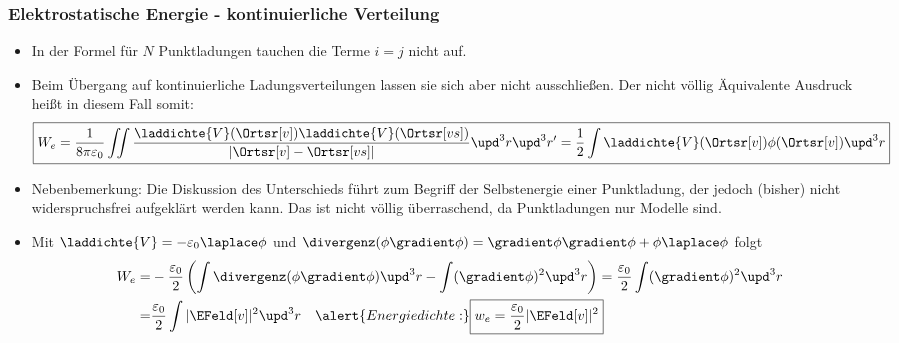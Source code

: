   \begin{frame}
    \frametitle{Elektrostatische Energie - kontinuierliche Verteilung}
    \begin{itemize}[<+->]
      \item In der Formel für $N$ Punktladungen tauchen die Terme
        $i=j$ nicht auf.
        \item Beim Übergang auf kontinuierliche Ladungsverteilungen
          lassen sie sich aber nicht ausschließen. Der \alert{nicht
            völlig Äquivalente} Ausdruck heißt in diesem Fall somit:
          $$
         \boxed{ W_e = \frac{1}{8\pi\varepsilon_0} \iint
    \frac{\laddichte{V}(\Ortsr[v]) \laddichte{V}(\Ortsr[vs])}{|\Ortsr[v]-
      \Ortsr[vs]|} \upd^3 r\upd^3 r' = \frac{1}{2} \int
    \laddichte{V}(\Ortsr[v])\phi(\Ortsr[v]) \upd^3 r}
  $$
  \item Nebenbemerkung: Die Diskussion des Unterschieds führt zum Begriff der
    \alert{Selbstenergie} einer Punktladung, der jedoch (bisher) nicht
    widerspruchsfrei aufgeklärt werden kann. Das ist nicht völlig
    überraschend, da Punktladungen nur Modelle sind.
    \item Mit $\laddichte{V}=-\varepsilon_0\laplace\phi$ und
      $\divergenz(\phi\gradient\phi) = \gradient\phi\gradient\phi + \phi\laplace\phi$
      folgt
      \begin{align*}
      W_e = & -\frac{\varepsilon_0}{2}\left(\int \divergenz(\phi\gradient\phi)
      \upd^3 r - \int (\gradient\phi)^2 \upd^3 r\right)  =
                     \frac{\varepsilon_0}{2} \int (\gradient\phi)^2 \upd^3 r\\
        = & \frac{\varepsilon_0}{2} \int |\EFeld[v]|^2 \upd^3 r
            \quad\alert{Energiedichte:} \boxed{w_e = \frac{\varepsilon_0}{2} |\EFeld[v]|^2}
      \end{align*}
    \end{itemize}
    \end{frame}

    
   

